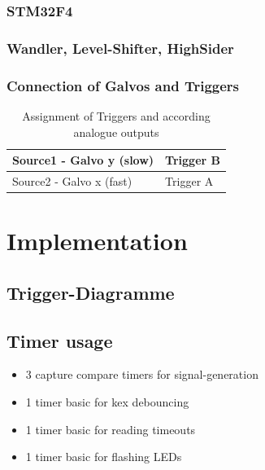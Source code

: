 \documentclass[master,english,smartquotes,apa]{hgbthesis}
\begin{document}
			\subsection{STM32F4}
			
			\subsection{Wandler, Level-Shifter, HighSider}
			\subsection{Connection of Galvos and Triggers}
				\begin{table}[h!]
					 \begin{tabular}{|p{5.5cm}|p{6cm}|} \hline
					Source1	- Galvo y (slow)& Trigger B\\ \hline
					Source2	- Galvo x (fast)& Trigger A\\ \hline
					 \end{tabular}
					 \caption{Assignment of Triggers and according analogue outputs}
				\end{table}

		
		
	\chapter{Implementation}
	\label{cha:Implementation}
		\section{Trigger-Diagramme}
		\section{Timer usage}
			\begin{itemize} \setlength\itemsep{1px}
			\item 3 capture compare timers for signal-generation
			\item 1 timer basic for kex debouncing 
			\item 1 timer basic for reading timeouts
			\item 1 timer basic for flashing LEDs
			\end{itemize}
\end{document}
